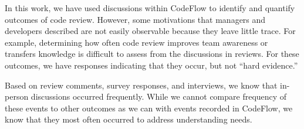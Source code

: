 In this work, we have used discussions within CodeFlow to identify and quantify outcomes of code review. However, some motivations that managers and developers described are not easily observable because they leave little trace. For example, determining how often code review improves team awareness or transfers knowledge is difficult to assess from the discussions in reviews. For these outcomes, we have responses indicating that they occur, but not ``hard evidence.''

Based on review comments, survey responses, and interviews, we know that in-person discussions occurred frequently. While we cannot compare frequency of these events to other outcomes as we can with events recorded in CodeFlow, we know that they most often occurred to address understanding needs.

